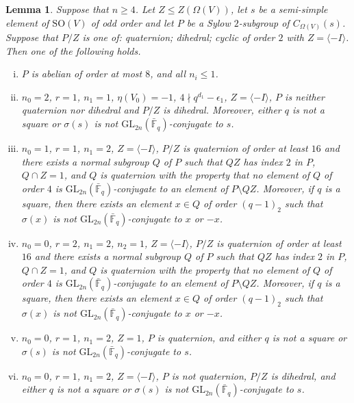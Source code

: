 \documentclass{amsart}
\theoremstyle{plain}\newtheorem{Theorem}{Theorem}[section]
\theoremstyle{plain}\newtheorem{Conjecture}[Theorem]{Conjecture}
\theoremstyle{plain}\newtheorem{Corollary}[Theorem]{Corollary}
\theoremstyle{plain}\newtheorem{Lemma}[Theorem]{Lemma}
\theoremstyle{plain}\newtheorem{Proposition}[Theorem]{Proposition}
\theoremstyle{definition}\newtheorem{Definition}[Theorem]{Definition}
\theoremstyle{definition}\newtheorem{Example}[Theorem]{Example}
\theoremstyle{definition}\newtheorem{Examples}[Theorem]{Examples}
\theoremstyle{definition}\newtheorem{Exercise}[Theorem]{Exercise}
\theoremstyle{definition}\newtheorem{Notation}[Theorem]{Notation}
\theoremstyle{definition}\newtheorem{Remark}[Theorem]{Remark}
\theoremstyle{definition}\newtheorem{Remarks}[Theorem]{Remarks}
\def\GL{\mathrm{GL}}
\def\SO{\mathrm{SO}}
\numberwithin{equation}{section}
\begin{document}
\begin{Lemma} \label{lem:Dsylow}   Suppose that $n \geq 4 $. Let  $Z \leq Z(\Omega (V) )$, let  $s$  be  a semi-simple element of $\SO(V)$ of odd order and let $P$  be  a Sylow $2$-subgroup of    $C_{\Omega(V)}(s)$.   Suppose that $P/Z$ is one of: quaternion; dihedral; cyclic of order $2$ with $ Z =\langle -I \rangle  $. Then one of the following holds.

\begin{enumerate} [(i)]\item  $P$ is abelian of order at most $8$, and all $n_i\leq 1 $.
\item  $n_0=2$,  $r=1 $, $n_1=1$,   $\eta(V_0)=  -1 $,  $4 \nmid q^{d_1} -\epsilon_1$, $Z=\langle -I \rangle $,  $P$  is neither quaternion nor dihedral  and $P/Z$ is dihedral. Moreover,  either $q$ is not a square or   $\sigma(s)$ is not $\GL_{2n}(\bar {\mathbb F}_q)$-conjugate to $s$. 

\item  $n_0=1$, $r=1$, $n_1=2$, $Z=\langle -I\rangle$, $P/Z$ is  quaternion of order at least $16$  and there exists a  normal subgroup  $Q$ of $P$ such that $QZ$ has  index $2$ in $P$, $Q \cap Z=1 $,  and $Q$ is quaternion   with the property that  no element of  $Q$ of order $4$ is  $\GL_{2n}(\bar {\mathbb F}_q)$-conjugate to  an element of  $P \setminus QZ$.  Moreover, if $q$ is a square, then  
there exists an element $x \in Q$ of order   $(q-1)_2$    such that $\sigma(x)$ is not $\GL_{2n}(\bar {\mathbb F}_q)$-conjugate to $x$ or $-x$.
\item  $n_0=0$, $r=2 $, $n_1=2$, $n_2 =1$, $Z=\langle -I\rangle$, $P/Z$ is  quaternion of order at least $16$   and there exists a  normal subgroup  $Q$ of $P$  such that $QZ$ has  index $2$ in $P$, $Q \cap Z=1 $,  and $Q$ is quaternion   with the property that  no element of  $Q$ of order $4$ is  $\GL_{2n}(\bar {\mathbb F}_q)$-conjugate to  an element of  $P \setminus QZ$.  Moreover, if $q$ is a square, then  
there exists an element $x \in Q$ of order   $(q-1)_2$    such that $\sigma(x)$ is not $\GL_{2n}(\bar {\mathbb F}_q)$-conjugate to $x$ or $-x$.
\item   $n_0=0$, $r=1 $,  $n_1=2$,  $Z=1$, $P$ is quaternion,  and either $q$ is not a square or   $\sigma(s)$ is not $\GL_{2n}(\bar {\mathbb F}_q)$-conjugate to $s$. 

\item $n_0=0$, $r=1 $,  $n_1=2 $,  $Z=\langle -I \rangle$,  $P$  is    not quaternion, $P/Z$  is  dihedral, and either  $q$ is not a square or   $\sigma(s)$ is not $\GL_{2n}(\bar {\mathbb F}_q)$-conjugate to $s$. 
\end{enumerate}
 \end{Lemma}
\end{document}
